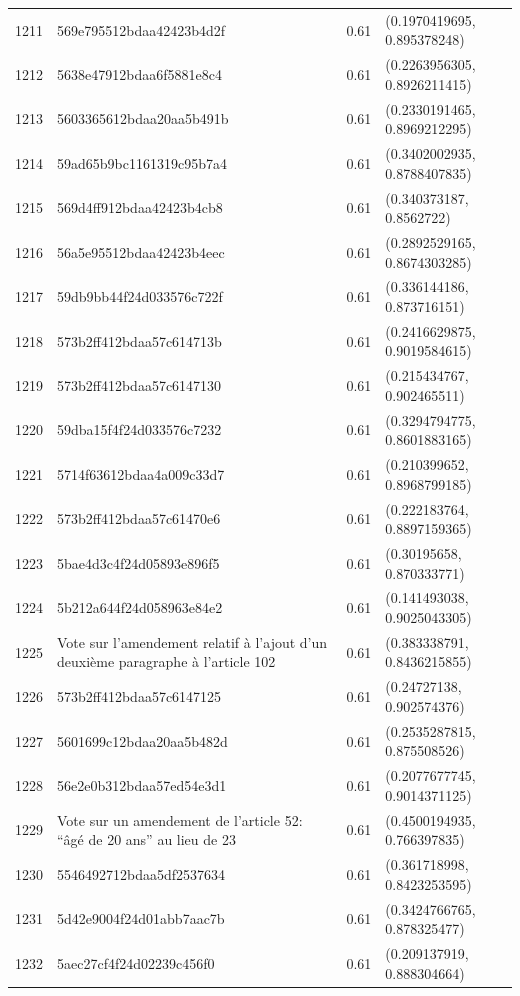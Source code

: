 \begin{table}[ht]
\begin{tabular}{rlrl}
  1211 & 569e795512bdaa42423b4d2f & 0.61 & (0.1970419695, 0.895378248) \\ 
  1212 & 5638e47912bdaa6f5881e8c4 & 0.61 & (0.2263956305, 0.8926211415) \\ 
  1213 & 5603365612bdaa20aa5b491b & 0.61 & (0.2330191465, 0.8969212295) \\ 
  1214 & 59ad65b9bc1161319c95b7a4 & 0.61 & (0.3402002935, 0.8788407835) \\ 
  1215 & 569d4ff912bdaa42423b4cb8 & 0.61 & (0.340373187, 0.8562722) \\ 
  1216 & 56a5e95512bdaa42423b4eec & 0.61 & (0.2892529165, 0.8674303285) \\ 
  1217 & 59db9bb44f24d033576c722f & 0.61 & (0.336144186, 0.873716151) \\ 
  1218 & 573b2ff412bdaa57c614713b & 0.61 & (0.2416629875, 0.9019584615) \\ 
  1219 & 573b2ff412bdaa57c6147130 & 0.61 & (0.215434767, 0.902465511) \\ 
  1220 & 59dba15f4f24d033576c7232 & 0.61 & (0.3294794775, 0.8601883165) \\ 
  1221 & 5714f63612bdaa4a009c33d7 & 0.61 & (0.210399652, 0.8968799185) \\ 
  1222 & 573b2ff412bdaa57c61470e6 & 0.61 & (0.222183764, 0.8897159365) \\ 
  1223 & 5bae4d3c4f24d05893e896f5 & 0.61 & (0.30195658, 0.870333771) \\ 
  1224 & 5b212a644f24d058963e84e2 & 0.61 & (0.141493038, 0.9025043305) \\ 
  1225 & Vote sur l'amendement relatif à l'ajout d'un deuxième paragraphe à l'article 102 & 0.61 & (0.383338791, 0.8436215855) \\ 
  1226 & 573b2ff412bdaa57c6147125 & 0.61 & (0.24727138, 0.902574376) \\ 
  1227 & 5601699c12bdaa20aa5b482d & 0.61 & (0.2535287815, 0.875508526) \\ 
  1228 & 56e2e0b312bdaa57ed54e3d1 & 0.61 & (0.2077677745, 0.9014371125) \\ 
  1229 & Vote sur un amendement de l'article 52: “âgé de 20 ans” au lieu de 23 & 0.61 & (0.4500194935, 0.766397835) \\ 
  1230 & 5546492712bdaa5df2537634 & 0.61 & (0.361718998, 0.8423253595) \\ 
  1231 & 5d42e9004f24d01abb7aac7b & 0.61 & (0.3424766765, 0.878325477) \\ 
  1232 & 5aec27cf4f24d02239c456f0 & 0.61 & (0.209137919, 0.888304664) \\ 

\end{tabular}
\end{table}
